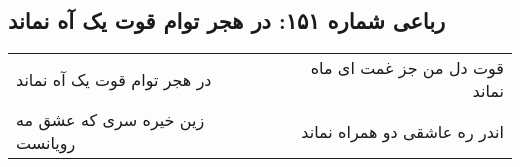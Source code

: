 \begin{center}
\section*{رباعی شماره ۱۵۱: در هجر توام قوت یک آه نماند}
\label{sec:sh151}
\begin{longtable}{l p{0.5cm} r}
در هجر توام قوت یک آه نماند
&&
قوت دل من جز غمت ای ماه نماند
\\
زین خیره سری که عشق مه رویانست
&&
اندر ره عاشقی دو همراه نماند
\\
\end{longtable}
\end{center}
